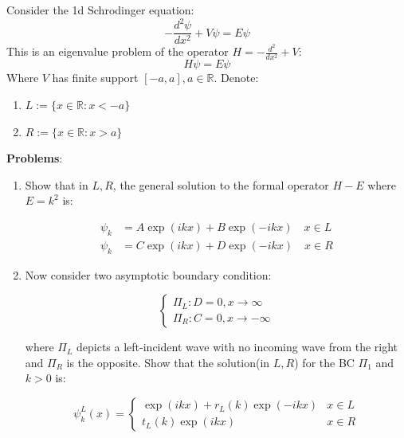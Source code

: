 \begin{mystexercise}\label{1dscat}Consider the 1d Schrodinger equation:
\begin{equation}
-\frac{d^2\psi}{dx^2}+V\psi = E\psi
\end{equation}
This is an eigenvalue problem of the operator $H= -\frac{d^2}{dx^2}+V$:
\begin{equation}
H\psi = E\psi
\end{equation}
Where $V$ has finite support $[ -a, a], a\in \mathbb{R}$. Denote:

\begin{enumerate}
\item $L:=\{x\in \mathbb{R}:x< -a\}$
\item $R:=\{x\in \mathbb{R}:x>a\}$
\end{enumerate}

\textbf{Problems}:

\begin{enumerate}
\item Show that in $L,R$, the general solution to the formal operator $H -E$ where $E=k^2$ is:

\begin{equation}
\begin{aligned}
\psi_k &=A\exp(ikx)+B\exp(-ikx) \quad x\in L  \\
\psi_k &=C\exp(ikx)+D\exp(-ikx) \quad x\in R
\end{aligned}
\end{equation}


\item Now consider two asymptotic boundary condition:

\begin{equation}
\begin{cases}
\Pi_L: D=0, x\to \infty \\
\Pi_R: C=0, x\to -\infty
\end{cases}
\end{equation}


where $\Pi_L$ depicts a left-incident wave with no incoming wave from the right and $\Pi_R$ is the opposite. Show that the solution(in $L,R$) for the BC $\Pi_1$ and $k>0$ is:

\begin{equation}
\psi_k^L(x) = \begin{cases}
\exp(ikx)+ r_L(k)\exp(-ikx) & x\in L \\
t_L(k)\exp(ikx) & x\in R
\end{cases}
\end{equation}



\end{enumerate}
\end{mystexercise}
